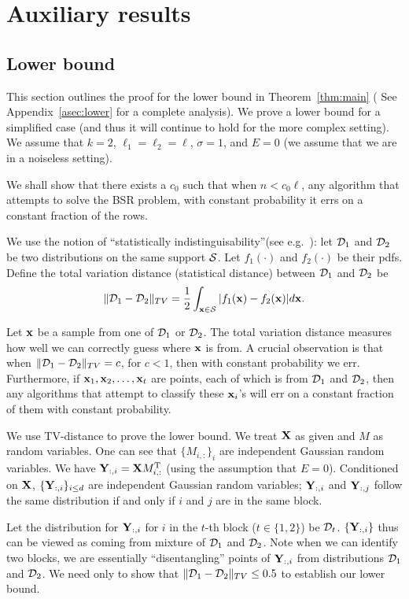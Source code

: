 \section{Auxiliary results}
\subsection{Lower bound}
This section outlines the proof for the lower bound in Theorem~\ref{thm:main} ( See Appendix~\ref{asec:lower} for a complete analysis). We prove a lower bound for a simplified case (and thus it will continue to hold for the more complex setting). We assume that $k = 2$, $\ell_1 = \ell_2 = \ell$, $\sigma = 1$, and $E = 0$ (we assume that we are in a noiseless setting). 

We shall show that there exists a $c_0$ such that when $n < c_0 \ell$, any algorithm that attempts to solve the BSR problem, with constant probability it errs on a constant fraction of the rows. 

We use the notion of ``statistically indistinguisability''(see e.g.~\cite{batu2013testing}): let $\mathcal{D}_1$ and $\mathcal{D}_2$ be two distributions on the same support $\mathcal{S}$. Let $f_1(\cdot)$ and $f_2(\cdot)$ be their pdfs. Define the total variation distance (statistical distance) between $\mathcal{D}_1$ and $\mathcal{D}_2$ be 
\begin{equation}
    \|\mathcal{D}_1 - \mathcal{D}_2\|_{TV} = \frac 1 2\int_{\mathbf{x} \in \mathcal{S}}|f_1(\mathbf{x}) - f_2(\mathbf{x})| d\mathbf{x}. 
\end{equation}


Let $\mathbf{x}$ be a sample from one of  $\mathcal{D}_1$ or $\mathcal{D}_2$. 
The total variation distance measures
how well we can correctly guess where $\mathbf{x}$ is from.
A crucial observation is that when $\|\mathcal{D}_1 - \mathcal{D}_2\|_{TV} = c$, for $c < 1$, then with constant probability we err. Furthermore, if $\mathbf{x}_1, \mathbf{x}_2, \dots, \mathbf{x}_t$ are points, each of which is from $\mathcal{D}_1$ and $\mathcal{D}_2$, then any algorithms that attempt to classify these $\mathbf{x}_i$'s will err on a constant fraction of them with constant probability. 
 

We use TV-distance to prove the lower bound. We treat $\mathbf{X}$ as given and $M$ as random variables. One can see that $\{M_{i, :}\}_i$ are independent Gaussian random variables. 
We have $\mathbf{Y}_{:, i} = \mathbf{X} M^{\mathrm{T}}_{i, :}$ (using the assumption that $E = 0$). Conditioned on $\mathbf{X}$, $\{\mathbf{Y}_{:, i}\}_{i \leq d} $ are independent Gaussian random variables; $\mathbf{Y}_{:, i}$ and $\mathbf{Y}_{:, j}$ follow the same distribution if and only if $i$ and $j$ are in the same block. 

Let the distribution for $\mathbf{Y}_{:, i}$ for $i$ in the $t$-th block ($t \in \{1, 2\}$) be $\mathcal{D}_t$. $\{\mathbf{Y}_{:, i}\}$ thus can be viewed as coming from mixture of $\mathcal{D}_1$ and $\mathcal{D}_2$. Note when we can identify two blocks, we are essentially ``disentangling'' points of $\mathbf{Y}_{:, i}$ from distributions $\mathcal{D}_1$ and $\mathcal{D}_2$. We need only to show that 
$\|\mathcal{D}_1 - \mathcal{D}_2\|_{TV} \leq 0.5$ to establish our lower bound. 
